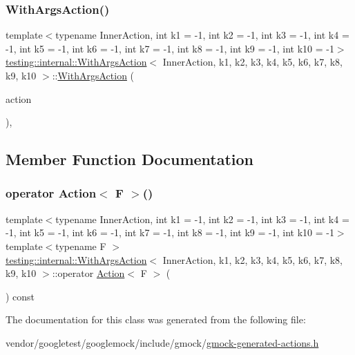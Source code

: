 \subsubsection{\texorpdfstring{With\+Args\+Action()}{WithArgsAction()}}
{\footnotesize\ttfamily template$<$typename Inner\+Action, int k1 = -\/1, int k2 = -\/1, int k3 = -\/1, int k4 = -\/1, int k5 = -\/1, int k6 = -\/1, int k7 = -\/1, int k8 = -\/1, int k9 = -\/1, int k10 = -\/1$>$ \\
\hyperlink{classtesting_1_1internal_1_1_with_args_action}{testing\+::internal\+::\+With\+Args\+Action}$<$ Inner\+Action, k1, k2, k3, k4, k5, k6, k7, k8, k9, k10 $>$\+::\hyperlink{classtesting_1_1internal_1_1_with_args_action}{With\+Args\+Action} (\begin{DoxyParamCaption}\item[{const Inner\+Action \&}]{action }\end{DoxyParamCaption})\hspace{0.3cm}{\ttfamily [inline]}, {\ttfamily [explicit]}}



\subsection{Member Function Documentation}
\mbox{\label{classtesting_1_1internal_1_1_with_args_action_ab6d8f89fd5a54f2914da2523b2ba6ee5}} 
\subsubsection{\texorpdfstring{operator Action$<$ F $>$()}{operator Action< F >()}}
{\footnotesize\ttfamily template$<$typename Inner\+Action, int k1 = -\/1, int k2 = -\/1, int k3 = -\/1, int k4 = -\/1, int k5 = -\/1, int k6 = -\/1, int k7 = -\/1, int k8 = -\/1, int k9 = -\/1, int k10 = -\/1$>$ \\
template$<$typename F $>$ \\
\hyperlink{classtesting_1_1internal_1_1_with_args_action}{testing\+::internal\+::\+With\+Args\+Action}$<$ Inner\+Action, k1, k2, k3, k4, k5, k6, k7, k8, k9, k10 $>$\+::operator \hyperlink{classtesting_1_1_action}{Action}$<$ F $>$ (\begin{DoxyParamCaption}{ }\end{DoxyParamCaption}) const\hspace{0.3cm}{\ttfamily [inline]}}



The documentation for this class was generated from the following file\+:\begin{DoxyCompactItemize}
\item 
vendor/googletest/googlemock/include/gmock/\hyperlink{gmock-generated-actions_8h}{gmock-\/generated-\/actions.\+h}\end{DoxyCompactItemize}

